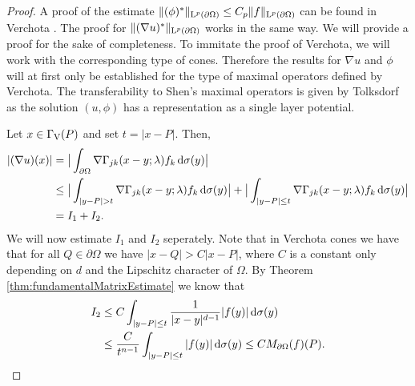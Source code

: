 \begin{proof}
  A proof of the estimate $\|(\phi)^*\|_{\mathrm{L}^p(\partial\Omega)} \leq C_p \|f\|_{\mathrm{L}^p(\partial\Omega)}$ can be found in Verchota \cite{verchota}.
  The proof for $\|(\nabla u)^*\|_{\mathrm{L}^p(\partial\Omega)}$ works in the same way. 
  We will provide a proof for the sake of completeness.
  To immitate the proof of Verchota, we will work with the corresponding type of cones.
  Therefore the results for $\nabla u$ and $\phi$ will at first only be established for the type of maximal operators defined by Verchota.
  The transferability to Shen's maximal operators is given by Tolksdorf \cite{tolksdorfDiss} as the solution $(u,\phi)$ has a representation as a single layer potential.

  Let $x \in \Gamma_\mathrm{V}(P)$ and set $t = |x - P|$.
  Then,
  \begin{align*}
    |(\nabla u)(x) |
    &= \big| \int_{\partial\Omega} \nabla \Gamma_{jk} (x - y; \lambda) f_k \, {\operatorname{d}\!{\sigma}}(y)\big| \\
    &\leq \big| \int_{|y - P| > t} \nabla\Gamma_{jk}(x - y; \lambda) f_k \, {\operatorname{d}\!{\sigma}}(y) \big| + \big| \int_{|y - P| \leq t} \nabla \Gamma_{jk}(x - y; \lambda) f_k \, {\operatorname{d}\!{\sigma}}(y)\big| \\
    &= I_1 + I_2.
  \end{align*}
  We will now estimate $I_1$ and $I_2$ seperately.
  Note that in Verchota cones we have that for all $Q \in \partial\Omega$ we have $|x - Q| > C |x - P|$, where $C$ is a constant only depending on $d$ and the Lipschitz character of $\Omega$.
  By Theorem \ref{thm:fundamentalMatrixEstimate} we know that
  \begin{align*}
    I_2 
    &\leq C \int_{|y - P| \leq t} \frac{1}{|x - y|^{d - 1}} |f(y)| \, {\operatorname{d}\!{\sigma}}(y) \\
    &\leq \frac{C}{t^{n - 1}} \int_{|y - P| \leq t} |f(y)| \, {\operatorname{d}\!{\sigma}}(y)
    \leq C M_{\partial\Omega} (f)(P).
  \end{align*}

\end{proof}
